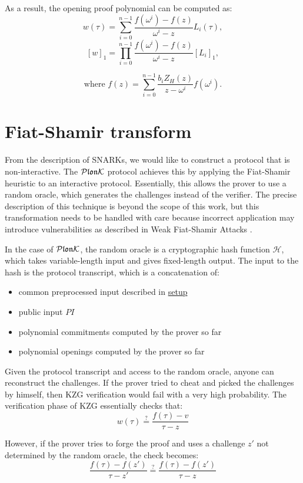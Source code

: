 As a result, the opening proof polynomial can be computed as:
$$w(\tau) = \sum_{i=0}^{n-1} \frac{f(\omega^i)-f(z)}{\omega^i-z} L_{i}(\tau),$$
$$[w]_1 = \prod_{i=0}^{n-1} \frac{f(\omega^i)-f(z)}{\omega^i-z} [L_{i}]_1,$$

$$\text{where } f(z) = \sum_{i=0}^{n-1} \frac{b_i Z_H(z)}{z-\omega^i}f(\omega^i).$$


\section{Fiat-Shamir transform}
From the description of SNARKs, we would like to construct a protocol that is non-interactive. The $\mathcal{P}\mathfrak{lon}\mathcal{K}$ protocol achieves this by applying the Fiat-Shamir heuristic \cite{fiat-shamir} to an interactive protocol. Essentially, this allows the prover to use a random oracle, which generates the challenges instead of the verifier. The precise description of this technique is beyond the scope of this work, but this transformation needs to be handled with care because incorrect application may introduce vulnerabilities as described in Weak Fiat-Shamir Attacks \cite{weak-FS}.

In the case of $\mathcal{P}\mathfrak{lon}\mathcal{K}$, the random oracle is a cryptographic hash function $\mathcal{H}$, which takes variable-length input and gives fixed-length output. The input to the hash is the protocol transcript, which is a concatenation of:
\begin{itemize}
    \item common preprocessed input described in \hyperref[chap:round0]{setup}
    \item public input $PI$
    \item polynomial commitments computed by the prover so far
    \item polynomial openings computed by the prover so far
\end{itemize}

Given the protocol transcript and access to the random oracle, anyone can reconstruct the challenges. If the prover tried to cheat and picked the challenges by himself, then KZG verification would fail with a very high probability. The verification phase of KZG essentially checks that: $$w(\tau) \stackrel{?}{=} \frac{f(\tau) - v}{\tau - z}$$
    
However, if the prover tries to forge the proof and uses a challenge $z'$ not determined by the random oracle, the check becomes: $$\frac{f(\tau) - f(z')}{\tau - z'} \stackrel{?}{=} \frac{f(\tau) - f(z')}{\tau - z}$$

